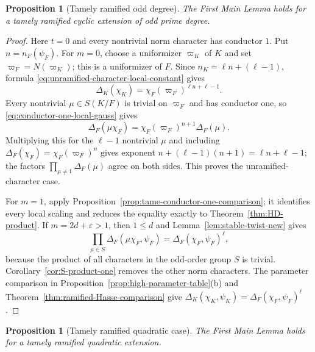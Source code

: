 \documentclass[11pt]{amsart}
\newtheorem{proposition}[theorem]{Proposition}
\theoremstyle{definition}
\theoremstyle{remark}
\begin{document}
\begin{proposition}[Tamely ramified odd degree]\label{prop:tame-odd-new}
The First Main Lemma holds for a tamely ramified cyclic extension of odd
prime degree.
\end{proposition}

\begin{proof}
Here $t=0$ and every nontrivial norm character has conductor $1$.
Put $n=n_F(\psi_F)$.  For $m=0$, choose a uniformizer
$\varpi_K$ of $K$ and set $\varpi_F=N(\varpi_K)$; this is a uniformizer
of $F$.  Since
$n_K=\ell n+(\ell-1)$, formula
\eqref{eq:unramified-character-local-constant} gives
\[
 \Delta_K(\chi_K)=
 \chi_F(\varpi_F)^{\ell n+\ell-1}.
\]
Every nontrivial $\mu\in S(K/F)$ is trivial on $\varpi_F$ and has
conductor one, so \eqref{eq:conductor-one-local-gauss} gives
\[
 \Delta_F(\mu\chi_F)=
 \chi_F(\varpi_F)^{n+1}\Delta_F(\mu).
\]
Multiplying this for the $\ell-1$ nontrivial $\mu$ and including
$\Delta_F(\chi_F)=\chi_F(\varpi_F)^n$ gives exponent
$n+(\ell-1)(n+1)=\ell n+\ell-1$; the factors
$\prod_{\mu\ne1}\Delta_F(\mu)$ agree on both sides.  This proves the
unramified-character case.

For $m=1$, apply Proposition~\ref{prop:tame-conductor-one-comparison}; it identifies every
local scaling and reduces the equality exactly to
Theorem~\ref{thm:HD-product}.
If $m=2d+\varepsilon>1$, then $1\leq d$ and
Lemma~\ref{lem:stable-twist-new} gives
\[
 \prod_{\mu\in S}\Delta_F(\mu\chi_F,\psi_F)
 =\Delta_F(\chi_F,\psi_F)^\ell,
\]
because the product of all characters in the odd-order group $S$ is
trivial.  Corollary~\ref{cor:S-product-one} removes the other norm
characters.  The parameter comparison in
Proposition~\ref{prop:high-parameter-table}(b) and
Theorem~\ref{thm:ramified-Hasse-comparison} give
$\Delta_K(\chi_K,\psi_K)=\Delta_F(\chi_F,\psi_F)^\ell$.
\end{proof}

\begin{proposition}[Tamely ramified quadratic case]\label{prop:tame-two-new}
The First Main Lemma holds for a tamely ramified quadratic extension.
\end{proposition}
\end{document}
